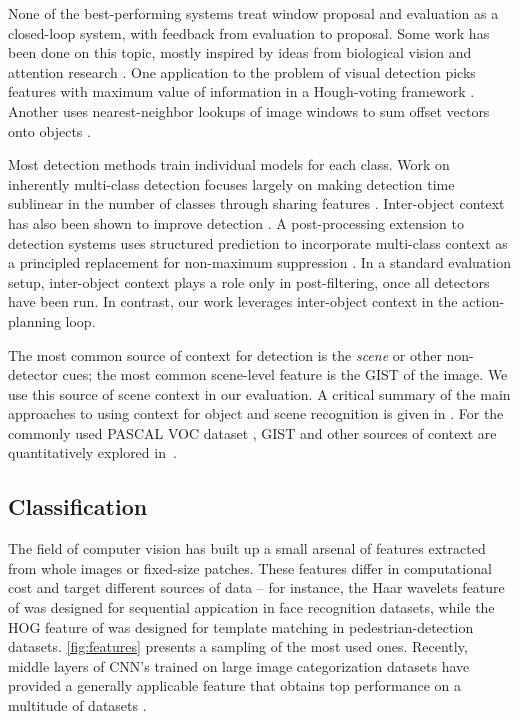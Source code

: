 None of the best-performing systems treat window proposal and evaluation as a closed-loop system, with feedback from evaluation to proposal.
Some work has been done on this topic, mostly inspired by ideas from biological vision and attention research \parencite{Butko2009,Vogel2008}.
One application to the problem of visual detection picks features with maximum value of information in a Hough-voting framework \parencite{Vijayanarasimhan2010}.
Another uses nearest-neighbor lookups of image windows to sum offset vectors onto objects \parencite{Alexe2012a}.

Most detection methods train individual models for each class.
Work on inherently multi-class detection focuses largely on making detection time sublinear in the number of classes through sharing features \parencite{Torralba2007,Fan2005}.
Inter-object context has also been shown to improve detection \parencite{Torralba2004}.
A post-processing extension to detection systems uses structured prediction to incorporate multi-class context as a principled replacement for non-maximum suppression \parencite{Desai2009}.
In a standard evaluation setup, inter-object context plays a role only in post-filtering, once all detectors have been run.
In contrast, our work leverages inter-object context in the action-planning loop.

The most common source of context for detection is the \emph{scene} or other non-detector cues; the most common scene-level feature is the GIST \parencite{Oliva-IJCV-2001} of the image.
We use this source of scene context in our evaluation.
A critical summary of the main approaches to using context for object and scene recognition is given in \parencite{Galleguillos2010}.
For the commonly used PASCAL VOC dataset \parencite{pascal-voc-2010}, GIST and other sources of context are quantitatively explored in~\parencite{Divvala2009}.

\subsection{Classification}



The field of computer vision has built up a small arsenal of features extracted from whole images or fixed-size patches.
These features differ in computational cost and target different sources of data -- for instance, the Haar wavelets feature of \cite{Viola-IJCV-2004} was designed for sequential appication in face recognition datasets, while the HOG feature of \cite{Dalal2005} was designed for template matching in pedestrian-detection datasets.
\autoref{fig:features} presents a sampling of the most used ones.
Recently, middle layers of CNN's trained on large image categorization datasets have provided a generally applicable feature that obtains top performance on a multitude of datasets \parencite{Donahue2013a}.

